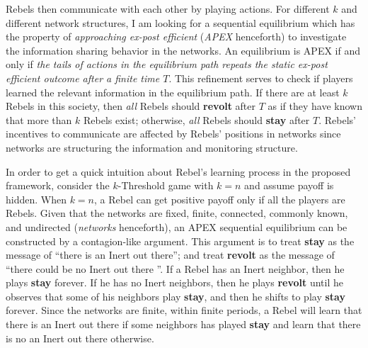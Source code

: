 \documentclass[12pt,letter]{article}
\theoremstyle{definition}
\theoremstyle{remark}
\theoremstyle{claim}
\begin{document}
Rebels then communicate with each other by playing actions. For different $k$ and different network structures, I am looking for a sequential equilibrium which has the property of \textit{approaching ex-post efficient} (\textit{APEX} henceforth) to investigate the information sharing behavior in the networks. An equilibrium is APEX if and only if \textit{the tails of actions in the equilibrium path repeats the static ex-post efficient outcome after a finite time $T$}.  This refinement serves to check if players learned the relevant information in the equilibrium path. If there are at least $k$ Rebels in this society, then \textit{all} Rebels should \textbf{revolt} after $T$ as if they have known that more than $k$ Rebels exist; otherwise, \textit{all} Rebels should \textbf{stay} after $T$. Rebels' incentives to communicate are affected by Rebels' positions in networks since networks are structuring the information and monitoring structure.

In order to get a quick intuition about Rebel's learning process in the proposed framework, consider the $k$-Threshold game with $k=n$ and assume payoff is hidden. When $k=n$, a Rebel can get positive payoff only if all the players are Rebels. Given that the networks are fixed, finite, connected, commonly known, and undirected (\textit{networks} henceforth), an APEX sequential equilibrium can be constructed by a contagion-like argument. This argument is to treat \textbf{stay} as the message of ``there is an Inert out there''; and treat \textbf{revolt} as the message of ``there could be no Inert out there ''. If a Rebel has an Inert neighbor, then he plays \textbf{stay} forever. If he has no Inert neighbors, then he plays \textbf{revolt} until he observes that some of his neighbors play \textbf{stay}, and then he shifts to play \textbf{stay} forever. Since the networks are finite,  within finite periods, a Rebel will learn that there is an Inert out there if some neighbors has played \textbf{stay} and learn that there is no an Inert out there otherwise.
\end{document}
